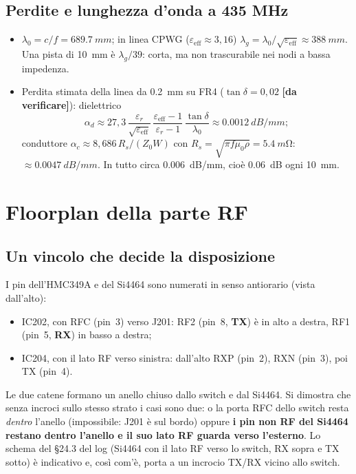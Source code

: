 \documentclass[a4paper,10pt]{article}
\newcommand{\dv}{\textcolor{verfr}{\textbf{[da verificare]}}}
\begin{document}
\subsection{Perdite e lunghezza d'onda a 435 MHz}
\begin{itemize}
\item $\lambda_0=c/f=\SI{689.7}{mm}$; in linea CPWG ($\varepsilon_\mathrm{eff}\approx3{,}16$)
      $\lambda_g=\lambda_0/\sqrt{\varepsilon_\mathrm{eff}}\approx\SI{388}{mm}$. Una pista di \SI{10}{mm} è
      $\lambda_g/39$: corta, ma non trascurabile nei nodi a bassa impedenza.
\item Perdita stimata della linea da \SI{0.2}{mm} su FR4 ($\tan\delta=0{,}02$ \dv):
      dielettrico
      \[\alpha_d\approx27{,}3\,\frac{\varepsilon_r}{\sqrt{\varepsilon_\mathrm{eff}}}\,\frac{\varepsilon_\mathrm{eff}-1}{\varepsilon_r-1}\,\frac{\tan\delta}{\lambda_0}\approx\SI{0.0012}{dB/mm};\]
      conduttore $\alpha_c\approx8{,}686\,R_s/(Z_0W)$ con $R_s=\sqrt{\pi f\mu_0\rho}=\SI{5.4}{m\ohm}$:
      $\approx\SI{0.0047}{dB/mm}$. In tutto circa \SI{0.006}{dB/mm}, cioè \SI{0.06}{dB} ogni \SI{10}{mm}.
\end{itemize}

\section{Floorplan della parte RF}
\label{sec:floorplan}

\subsection{Un vincolo che decide la disposizione}
\begin{attenzione}
I pin dell'HMC349A e del Si4464 sono numerati in senso antiorario (vista dall'alto):
\begin{itemize}
\item IC202, con RFC (pin~3) verso J201: RF2 (pin~8, \textbf{TX}) è in alto a destra, RF1 (pin~5,
      \textbf{RX}) in basso a destra;
\item IC204, con il lato RF verso sinistra: dall'alto RXP (pin~2), RXN (pin~3), poi TX (pin~4).
\end{itemize}
Le due catene formano un anello chiuso dallo switch e dal Si4464. Si dimostra che senza incroci
sullo stesso strato i casi sono due: o la porta RFC dello switch resta \emph{dentro} l'anello (impossibile:
J201 è sul bordo) oppure \textbf{i pin non RF del Si4464 restano dentro l'anello e il suo lato RF guarda
verso l'esterno}. Lo schema del \S24.3 del log (Si4464 con il lato RF verso lo switch, RX sopra e TX
sotto) è indicativo e, così com'è, porta a un incrocio TX/RX vicino allo switch.
\end{attenzione}
\end{document}
